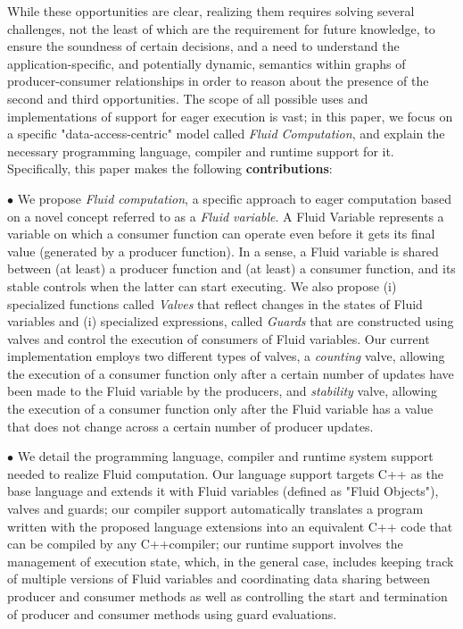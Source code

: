 While these opportunities are clear, realizing them requires solving several challenges, not the least of which are the requirement for future knowledge, to ensure the soundness of certain decisions, and a need to understand the application-specific, and potentially dynamic, semantics within graphs of producer-consumer relationships in order to reason about the presence of the second and third opportunities. The scope of all possible uses and implementations of support for eager execution is vast; in this paper, we focus on a specific "data-access-centric" model called {\em Fluid Computation}, and explain the necessary programming language, compiler and runtime support for it. Specifically, this paper makes the following {\bf contributions}:

$\bullet$ We propose {\em Fluid computation}, a specific approach to eager computation based on a novel concept referred to as a {\em Fluid variable}. A Fluid Variable represents a variable on which a consumer function can operate even before it gets its final value (generated by a producer function). In a sense, a Fluid variable is shared between (at least) a producer function and (at least) a consumer function, and its stable controls when the latter can start executing. We also propose (i) specialized functions called {\em Valves} that reflect changes in the states of Fluid variables and (i) specialized expressions, called {\em Guards} that are constructed using valves and control the execution of consumers of Fluid variables. Our current implementation employs two different types of valves, a \textit{counting} valve, allowing the execution of a consumer function only after a certain number of updates have been made to the Fluid variable by the producers, and \textit{stability} valve, allowing the execution of a consumer function only after the Fluid variable has a value that does not change across a certain number of producer updates.


$\bullet$ We detail the programming language, compiler and runtime system support needed to realize Fluid computation. Our language support targets C++ as the base language and extends it with Fluid variables (defined as "Fluid Objects"), valves and guards; our compiler support automatically translates a program written with the proposed language extensions into an equivalent C++ code that can be compiled by any C++compiler; our runtime support involves the management of execution state, which, in the general case, includes keeping track of multiple versions of Fluid variables and coordinating data sharing between producer and consumer methods as well as controlling the start and termination of producer and consumer methods using guard evaluations.

